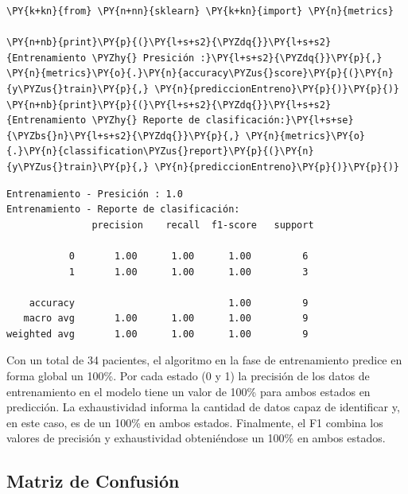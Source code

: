     \begin{tcolorbox}[breakable, size=fbox, boxrule=1pt, pad at break*=1mm,colback=cellbackground, colframe=cellborder]
\begin{Verbatim}[commandchars=\\\{\}]
\PY{k+kn}{from} \PY{n+nn}{sklearn} \PY{k+kn}{import} \PY{n}{metrics}

\PY{n+nb}{print}\PY{p}{(}\PY{l+s+s2}{\PYZdq{}}\PY{l+s+s2}{Entrenamiento \PYZhy{} Presición :}\PY{l+s+s2}{\PYZdq{}}\PY{p}{,} \PY{n}{metrics}\PY{o}{.}\PY{n}{accuracy\PYZus{}score}\PY{p}{(}\PY{n}{y\PYZus{}train}\PY{p}{,} \PY{n}{prediccionEntreno}\PY{p}{)}\PY{p}{)}
\PY{n+nb}{print}\PY{p}{(}\PY{l+s+s2}{\PYZdq{}}\PY{l+s+s2}{Entrenamiento \PYZhy{} Reporte de clasificación:}\PY{l+s+se}{\PYZbs{}n}\PY{l+s+s2}{\PYZdq{}}\PY{p}{,} \PY{n}{metrics}\PY{o}{.}\PY{n}{classification\PYZus{}report}\PY{p}{(}\PY{n}{y\PYZus{}train}\PY{p}{,} \PY{n}{prediccionEntreno}\PY{p}{)}\PY{p}{)}
\end{Verbatim}
\end{tcolorbox}

    \begin{Verbatim}[commandchars=\\\{\}]
Entrenamiento - Presición : 1.0
Entrenamiento - Reporte de clasificación:
               precision    recall  f1-score   support

           0       1.00      1.00      1.00         6
           1       1.00      1.00      1.00         3

    accuracy                           1.00         9
   macro avg       1.00      1.00      1.00         9
weighted avg       1.00      1.00      1.00         9

    \end{Verbatim}

    Con un total de 34 pacientes, el algoritmo en la fase de entrenamiento predice en forma global un 100\%. Por cada estado (0 y 1) la precisión de los datos de entrenamiento en el modelo tiene un valor de 100\% para ambos estados en predicción. La exhaustividad informa la cantidad de datos capaz de identificar y, en este caso, es de un 100\% en ambos estados. Finalmente, el F1 combina los valores de precisión y exhaustividad obteniéndose un 100\% en ambos estados.

    \hypertarget{matriz-de-confusiuxf3n}{%
\subsection{Matriz de Confusión}\label{matriz-de-confusiuxf3n}}

